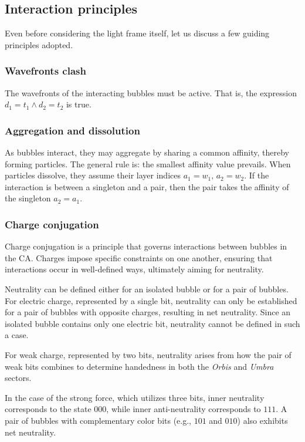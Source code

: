\documentclass[12pt,english]{article}
\begin{document}
\subsection{Interaction principles}
Even before considering the light frame itself, let us discuss a few guiding principles adopted.

\subsubsection{Wavefronts clash}
The wavefronts of the interacting bubbles must be active. That is, the expression $d_1 = t_1 \wedge d_2 = t_2$ is true.

\subsubsection{Aggregation and dissolution}\label{subsec-role-of-affinity}

As bubbles interact, they may aggregate by sharing a common affinity, thereby forming particles. The general rule is: the smallest affinity value prevails. When particles dissolve, they assume their layer indices $a_1 = w_1, \, a_2 = w_2$. If the interaction is between a singleton and a pair, then the pair takes the affinity of the singleton $a_2=a_1$.

\subsubsection{Charge conjugation}

Charge conjugation is a principle that governs interactions between bubbles in the CA. Charges impose specific constraints on one another, ensuring that interactions occur in well-defined ways, ultimately aiming for neutrality.

Neutrality can be defined either for an isolated bubble or for a pair of bubbles. For electric charge, represented by a single bit, neutrality can only be established for a pair of bubbles with opposite charges, resulting in net neutrality. Since an isolated bubble contains only one electric bit, neutrality cannot be defined in such a case.

For weak charge, represented by two bits, neutrality arises from how the pair of weak bits combines to determine handedness in both the \textit{Orbis} and \textit{Umbra} sectors.

In the case of the strong force, which utilizes three bits, inner neutrality corresponds to the state \(000\), while inner anti-neutrality corresponds to \(111\). A pair of bubbles with complementary color bits (e.g., \(101\) and \(010\)) also exhibits net neutrality.
\end{document}
